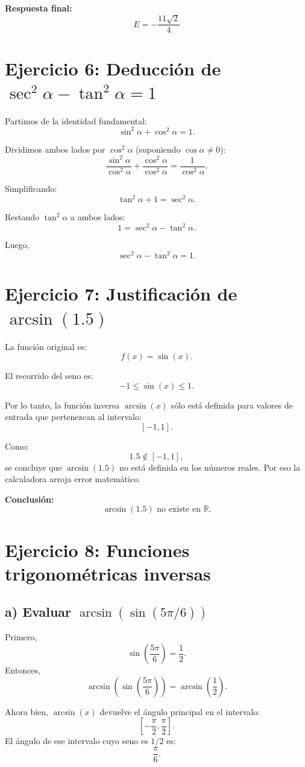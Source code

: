 \documentclass[12pt]{article}
\begin{document}
	\textbf{Respuesta final:}
	\[
	\boxed{E=-\frac{11\sqrt2}{4}}
	\]
	
	\section*{Ejercicio 6: Deducción de \(\sec^2\alpha-\tan^2\alpha=1\)}
	Partimos de la identidad fundamental:
	\[
	\sin^2\alpha+\cos^2\alpha=1.
	\]
	
	Dividimos ambos lados por \(\cos^2\alpha\) (suponiendo \(\cos\alpha\neq 0\)):
	\[
	\frac{\sin^2\alpha}{\cos^2\alpha}+\frac{\cos^2\alpha}{\cos^2\alpha}=\frac{1}{\cos^2\alpha}.
	\]
	
	Simplificando:
	\[
	\tan^2\alpha+1=\sec^2\alpha.
	\]
	
	Restando \(\tan^2\alpha\) a ambos lados:
	\[
	1=\sec^2\alpha-\tan^2\alpha.
	\]
	
	Luego,
	\[
	\boxed{\sec^2\alpha-\tan^2\alpha=1.}
	\]
	
	\section*{Ejercicio 7: Justificación de \(\arcsin(1.5)\)}
	La función original es:
	\[
	f(x)=\sin(x).
	\]
	
	El recorrido del seno es:
	\[
	-1\leq \sin(x) \leq 1.
	\]
	
	Por lo tanto, la función inversa \(\arcsin(x)\) sólo está definida para valores de entrada que pertenezcan al intervalo:
	\[
	[-1,1].
	\]
	
	Como:
	\[
	1.5\notin[-1,1],
	\]
	se concluye que \(\arcsin(1.5)\) no está definida en los números reales. Por eso la calculadora arroja error matemático.
	
	\textbf{Conclusión:}
	\[
	\boxed{\arcsin(1.5)\text{ no existe en }\mathbb{R}.}
	\]
	
	\section*{Ejercicio 8: Funciones trigonométricas inversas}
	\subsection*{a) Evaluar \(\arcsin(\sin(5\pi/6))\)}
	Primero,
	\[
	\sin\left(\frac{5\pi}{6}\right)=\frac12.
	\]
	Entonces,
	\[
	\arcsin\left(\sin\left(\frac{5\pi}{6}\right)\right)=\arcsin\left(\frac12\right).
	\]
	
	Ahora bien, \(\arcsin(x)\) devuelve el ángulo principal en el intervalo:
	\[
	\left[-\frac\pi2,\frac\pi2\right].
	\]
	El ángulo de ese intervalo cuyo seno es \(1/2\) es:
	\[
	\frac\pi6.
	\]
	
\end{document}
